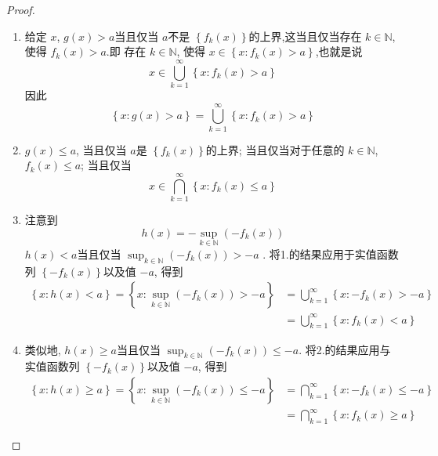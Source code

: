 \documentclass[../main.tex]{subfiles}
\begin{document}
\begin{proof}
    \begin{enumerate}
        \item 给定 \(  x  \), \(  g\left( x \right)> a   \)当且仅当 \(  a  \)不是 \(  \left\{ f_{k}\left( x \right)  \right\}  \)的上界,这当且仅当存在 \(  k\in \mathbb{N}   \),使得 \(  f_{k}\left( x \right)> a   \).即 存在 \(  k \in \mathbb{N}   \), 使得 \(  x \in \left\{ x:f_{k}\left( x \right)> a  \right\}  \),也就是说 \[
        x \in \bigcup _{k= 1}^{\infty}\left\{ x:f_{k}\left( x \right)> a  \right\}
        \]因此 \[
        \left\{ x:g\left( x \right)> a  \right\}= \bigcup _{k= 1}^{\infty}\left\{ x:f_{k}\left( x \right)> a  \right\}
        \]  
        \item  \(  g\left( x \right)\le a   \), 当且仅当 \(  a  \)是 \(  \left\{ f_{k}\left( x \right)  \right\}  \)的上界; 当且仅当对于任意的   \(  k\in \mathbb{N}   \), \(  f_{k}\left( x \right)\le a   \); 当且仅当 \[
        x \in \bigcap_{k= 1}^{\infty}\left\{ x:f_{k}\left( x \right)\le a  \right\} 
        \]
        \item 注意到 \[
        h\left( x \right)=  -\sup _{k\in \mathbb{N} }(-f_{k}\left( x \right) ) 
        \] \(  h\left( x \right)< a   \)当且仅当 \(  \sup _{k\in \mathbb{N} }(-f_{k}\left( x \right) )> -a  \) . 将1.的结果应用于实值函数列 \(  \left\{ -f_{k}\left( x \right)  \right\}  \)以及值 \( - a  \), 得到 \[
        \begin{aligned}
        \left\{ x:h\left( x \right)< a  \right\}= \left\{ x: \sup _{k\in \mathbb{N} }\left( -f_{k}\left( x \right) \right) > -a  \right\}&= \bigcup _{k= 1}^{\infty} \left\{ x: -f_{k}\left( x \right) > -a \right\}\\ 
         &= \bigcup _{k= 1}^{\infty}\left\{ x:  f_{k}\left( x \right)< a \right\}
        \end{aligned}
        \]   
        \item 类似地, \(  h\left( x \right)\ge a   \)当且仅当 \(  \sup _{k\in \mathbb{N} }(-f_{k}\left( x \right) )\le -a  \). 将2.的结果应用与实值函数列 \(  \left\{ -f_{k}\left( x \right)  \right\}  \)以及值 \(  -a  \), 得到   \[
        \begin{aligned}
        \left\{ x:h\left( x \right)\ge a  \right\}= \left\{ x:\sup _{k\in \mathbb{N} }(-f_{k}\left( x \right) )\le -a \right\}&= \bigcap _{k= 1}^{\infty}\left\{ x:-f_{k}\left( x \right)\le -a  \right\}\\ 
         &= \bigcap _{k= 1}^{\infty}\left\{ x:f_{k}\left( x \right)\ge a  \right\} 
        \end{aligned}
        \]  
    \end{enumerate}
    
\end{proof}
\end{document}
